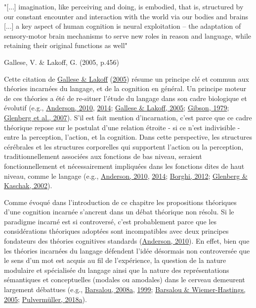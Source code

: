 \documentclass[
  a4paper,12pt,twoside,onecolumn,openright,final,oldfontcommands]{memoir}
\begin{document}
\epigraph{"[...] imagination, like perceiving and doing, is embodied, that is, structured by our constant encounter and interaction with the world via our bodies and brains [...] a key aspect of human cognition is neural exploitation – the adaptation of sensory-motor brain mechanisms to serve new roles in reason and language, while retaining their original functions as well"}{Gallese, V. \& Lakoff, G. (2005, p.456)}

Cette citation de \protect\hyperlink{ref-gallese_brains_2005}{Gallese \& Lakoff} (\protect\hyperlink{ref-gallese_brains_2005}{2005}) résume un principe clé et commun aux théories incarnées du langage, et de la cognition en général. Un principe moteur de ces théories a été de re-situer l'étude du langage dans son cadre biologique et évolutif (e.g., \protect\hyperlink{ref-anderson_neural_2010}{Anderson, 2010}, \protect\hyperlink{ref-anderson_after_2014}{2014}; \protect\hyperlink{ref-gallese_brains_2005}{Gallese \& Lakoff, 2005}; \protect\hyperlink{ref-gibson_ecological_1979}{Gibson, 1979}; \protect\hyperlink{ref-glenberg_what_2007}{Glenberg et al., 2007}). S'il est fait mention d'incarnation, c'est parce que ce cadre théorique repose sur le postulat d'une relation étroite - si ce n'est indivisible - entre la perception, l'action, et la cognition. Dans cette perspective, les structures cérébrales et les structures corporelles qui supportent l'action ou la perception, traditionnellement associées aux fonctions de bas niveau, seraient fonctionnellement et nécessairement impliquées dans les fonctions dites de haut niveau, comme le langage (e.g., \protect\hyperlink{ref-anderson_neural_2010}{Anderson, 2010}, \protect\hyperlink{ref-anderson_after_2014}{2014}; \protect\hyperlink{ref-borghi_language_2012}{Borghi, 2012}; \protect\hyperlink{ref-glenberg_grounding_2002}{Glenberg \& Kaschak, 2002}).

Comme évoqué dans l'introduction de ce chapitre les propositions théoriques d'une cognition incarnée s'ancrent dans un débat théorique non résolu. Si le paradigme incarné est si controversé, c'est probablement parce que les considérations théoriques adoptées sont incompatibles avec deux principes fondateurs des théories cognitives standards (\protect\hyperlink{ref-anderson_neural_2010}{Anderson, 2010}). En effet, bien que les théories incarnées du langage défendent l'idée désormais non controversée que le sens d'un mot est acquis au fil de l'expérience, la question de la nature modulaire et spécialisée du langage ainsi que la nature des représentations sémantiques et conceptuelles (modales ou amodales) dans le cerveau demeurent largement débattues (e.g., \protect\hyperlink{ref-barsalou_grounded_2008}{Barsalou, 2008a}, \protect\hyperlink{ref-barsalou_perceptual_1999}{1999}; \protect\hyperlink{ref-pecher_situating_2005}{Barsalou \& Wiemer-Hastings, 2005}; \protect\hyperlink{ref-pulvermuller_neural_2018}{Pulvermüller, 2018a}).
\end{document}
